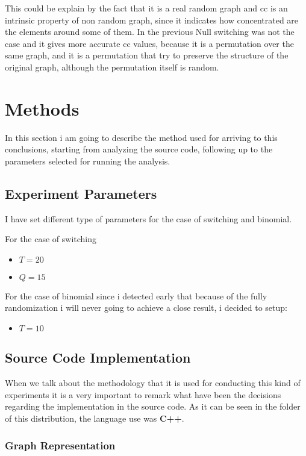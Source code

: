 \documentclass[12pt, a4paper]{article}
\begin{document}
This could be explain by the fact that it is a real random graph and \acrshort{cc} is an intrinsic property of non random graph, since it indicates how concentrated 
are the elements around some of them. In the previous Null \acrshort{switching} was not the case and it gives more accurate \acrshort{cc} values, because it is a permutation
over the same graph, and it is a permutation that try to preserve the structure of the original graph, although the permutation itself is random.

\section{Methods}
In this section i am going to describe the method used for arriving to this conclusions, starting from analyzing the source code, following up to the parameters selected
for running the analysis.


\subsection{Experiment Parameters}
I have set different type of parameters for the case of \acrshort{switching} and \acrshort{binomial}.

For the case of \acrshort{switching}
\begin{itemize}
    \item $T = 20$ 
    \item $Q = 15$
\end{itemize}

For the case of \acrshort{binomial} since i detected early that because of the fully randomization i will never going to achieve a close result, i decided
to setup:
\begin{itemize}
    \item $T = 10$ 
\end{itemize}


\subsection{Source Code Implementation}
When we talk about the methodology that it is used for conducting this kind of experiments it is a very important to remark what have been the decisions regarding the implementation in the source
code.
As it can be seen in the folder of this distribution, the language use was \textbf{C++}.

\subsubsection{Graph Representation}
\end{document}
